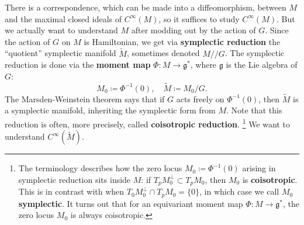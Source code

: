 \documentclass{report}
\theoremstyle{plain}
\theoremstyle{definition}
\theoremstyle{remark}
\newcommand{\fg}{\mathfrak{g}}
\begin{document}
There is a correspondence, which can be made into a diffeomorphism,
between $M$ and the maximal closed ideals of $C^\infty(M)$, so it
suffices to study $C^\infty(M)$. But we actually want to understand
$M$ after modding out by the action of $G$. Since the action of $G$ on
$M$ is Hamiltonian, we get via {\bf symplectic reduction} the
``quotient'' symplectic manifold $\tilde{M}$, sometimes denoted
$M//G$. The symplectic reduction is done via the {\bf moment map}
$\Phi\colon M \to \fg^*$, where $\fg$ is the Lie algebra of $G$:
\[ M_0 \coloneqq \Phi^{-1}(0), \quad \tilde{M} \coloneqq M_0/G. \]
The Marsden-Weinstein theorem says that if $G$ acts freely on
$\Phi^{-1}(0)$, then $\tilde{M}$ is a symplectic manifold, inheriting
the symplectic form from $M$. Note that this reduction is often, more
precisely, called {\bf coisotropic reduction}.
\footnote{The terminology describes how the zero locus $M_0 \coloneqq
  \Phi^{-1}(0)$ arising in symplectic reduction sits inside $M$: if
  $T_pM_0^\perp \subset T_pM_0$, then $M_0$ is {\bf coisotropic}. This
  is in contrast with when $T_0M_0^\perp \cap T_pM_0 = \{0\}$, in
  which case we call $M_0$ {\bf symplectic}. It turns out that for an
  equivariant moment map $\Phi\colon M \to \fg^*$, the zero locus
  $M_0$ is always coisotropic.}
We want to understand $C^\infty(\tilde{M})$.
\end{document}
